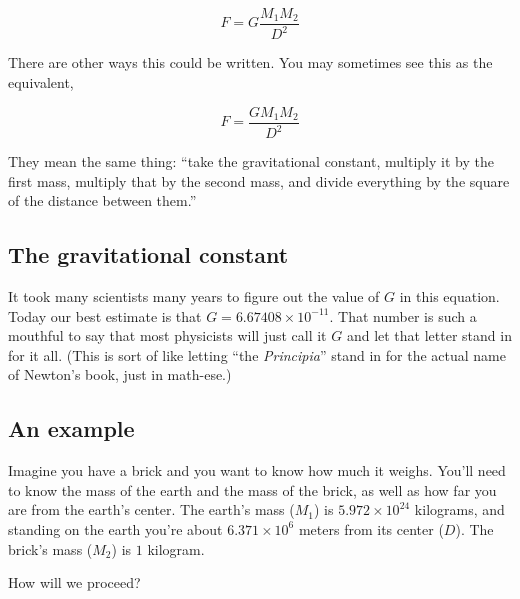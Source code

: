 \documentclass[12pt,letterpaper]{article}
\begin{document}
\[
F = G\frac{M_1 M_2}{D^2}
\]

There are other ways this could be written.  You may sometimes see
this as the equivalent,

\[
F = \frac{G M_1 M_2}{D^2}
\]

They mean the same thing: ``take the gravitational constant, multiply
it by the first mass, multiply that by the second mass, and divide
everything by the square of the distance between them.''

\subsection{The gravitational constant}
It took many scientists many years to figure out the value of $G$ in
this equation.  Today our best estimate is that $G = 6.67408 \times
10^{-11}$.  That number is such a mouthful to say that most physicists
will just call it $G$ and let that letter stand in for it all.  (This
is sort of like letting ``the \textit{Principia}'' stand in for the
actual name of Newton's book, just in math-ese.)

\subsection{An example}
Imagine you have a brick and you want to know how much it
weighs. You'll need to know the mass of the earth and the mass of the
brick, as well as how far you are from the earth's center.  The
earth's mass ($M_1$) is $5.972 \times 10^{24}$ kilograms, and standing
on the earth you're about $6.371 \times 10^6$ meters from its center
($D$).  The brick's mass ($M_2$) is $1$ kilogram.

How will we proceed?
\end{document}
